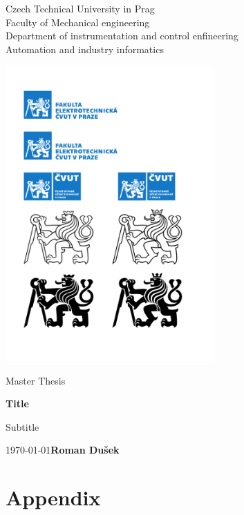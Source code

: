 \documentclass[a4paper]{article}
\begin{document}
\begin{titlepage}
    \begin{center}
        \vspace*{1cm}
        
        \LARGE
        Czech Technical University in Prag\\[0.1cm]
       	Faculty of Mechanical engineering\\[0.4cm]
		\Large
        Department of instrumentation and control enfineering\\[0.25cm]
        \large
        Automation and industry informatics\\

		\vfill
            
        \includegraphics[width=0.6\textwidth]{lion_white}
                    
        \vfill
        \Large
        Master Thesis

        \vspace{0.8cm}           

        \Huge
        \textbf{Title}
            
        \vspace{0.5cm}
        \LARGE
        Subtitle
        \vspace{3cm}

        \today \hfill \textbf{Roman Dušek}
    \end{center}
\end{titlepage}
\newpage
\tableofcontents
\newpage





\newpage
\nocite{*}
\printbibliography
{}
\newpage

\appendix
\part*{Appendix}
	
\end{document}
